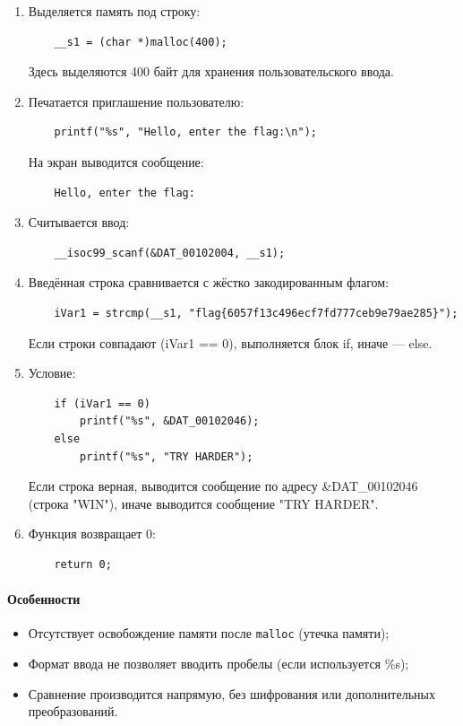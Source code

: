 \documentclass{article}
\begin{document}
\begin{enumerate}
    \item Выделяется память под строку:
    \begin{verbatim}
    __s1 = (char *)malloc(400);
    \end{verbatim}
    Здесь выделяются 400 байт для хранения пользовательского ввода.

    \item Печатается приглашение пользователю:
    \begin{verbatim}
    printf("%s", "Hello, enter the flag:\n");
    \end{verbatim}
    На экран выводится сообщение:
    \begin{verbatim}
    Hello, enter the flag:
    \end{verbatim}

    \item Считывается ввод:
    \begin{verbatim}
    __isoc99_scanf(&DAT_00102004, __s1);
    \end{verbatim}

    \item Введённая строка сравнивается с жёстко закодированным флагом:
    \begin{verbatim}
    iVar1 = strcmp(__s1, "flag{6057f13c496ecf7fd777ceb9e79ae285}");
    \end{verbatim}
    Если строки совпадают (iVar1 == 0), выполняется блок if, иначе --- else.

    \item Условие:
    \begin{verbatim}
    if (iVar1 == 0) 
        printf("%s", &DAT_00102046);
    else
        printf("%s", "TRY HARDER");
    \end{verbatim}
    Если строка верная, выводится сообщение по адресу \&DAT\_00102046 (строка "WIN"), иначе выводится сообщение "TRY HARDER".

    \item Функция возвращает 0:
    \begin{verbatim}
    return 0;
    \end{verbatim}
\end{enumerate}

\noindent
\paragraph{Особенности}
\begin{itemize}
    \item Отсутствует освобождение памяти после \texttt{malloc} (утечка памяти);
    \item Формат ввода не позволяет вводить пробелы (если используется \%s);
    \item Сравнение производится напрямую, без шифрования или дополнительных преобразований.
\end{itemize}
\end{document}
